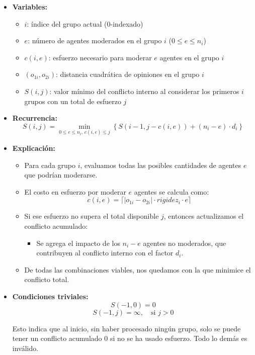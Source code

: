 \documentclass[11pt,letter]{article}
\begin{document}
\begin{itemize}
    \item \textbf{Variables:}
    \begin{itemize}
        \item $i$: índice del grupo actual ($0$-indexado)
        \item $e$: número de agentes moderados en el grupo $i$ ($0 \leq e \leq n_i$)
        \item $c(i, e)$: esfuerzo necesario para moderar $e$ agentes en el grupo $i$
        \item $(o_{1i}, o_{2i})$: distancia cuadrática de opiniones en el grupo $i$
        \item $S(i, j)$: valor mínimo del conflicto interno al considerar los primeros $i$ grupos con un total de esfuerzo $j$
    \end{itemize}

    \item \textbf{Recurrencia:}
    \[
    S(i, j) = \min_{0 \leq e \leq n_i,\, c(i,e) \leq j} \left\{ S(i - 1, j - c(i, e)) + (n_i - e) \cdot d_i \right\}
    \]

    \item \textbf{Explicación:}
    \begin{itemize}
        \item Para cada grupo $i$, evaluamos todas las posibles cantidades de agentes $e$ que podrían moderarse.
        \item El costo en esfuerzo por moderar $e$ agentes se calcula como:
        \[
            c(i, e) = \lceil |o_{1i} - o_{2i}| \cdot rigidez_i \cdot e \rceil
        \]
        \item Si ese esfuerzo no supera el total disponible $j$, entonces actualizamos el conflicto acumulado:
        \begin{itemize}
            \item Se agrega el impacto de los $n_i - e$ agentes no moderados, que contribuyen al conflicto interno con el factor $d_i$.
        \end{itemize}
        \item De todas las combinaciones viables, nos quedamos con la que minimice el conflicto total.
    \end{itemize}

    \item \textbf{Condiciones triviales:}
    \[
    S(-1, 0) = 0
    \]
    \[
    S(-1, j) = \infty, \quad \text{si } j > 0
    \]

    Esto indica que al inicio, sin haber procesado ningún grupo, solo se puede tener un conflicto acumulado 0 si no se ha usado esfuerzo. Todo lo demás es inválido.


\end{itemize}
\end{document}

